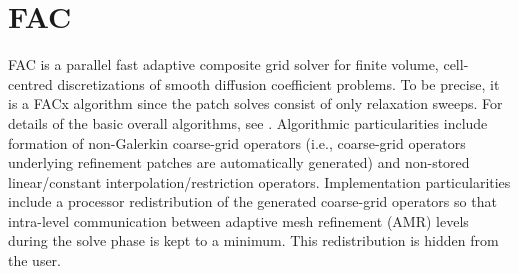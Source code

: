 
\section{FAC}

FAC is a parallel fast adaptive composite grid solver for finite volume,
cell-centred discretizations of smooth diffusion coefficient problems. 
To be precise, it is a FACx algorithm since the patch solves consist of only
relaxation sweeps. For details of the basic overall algorithms, see \cite{SFMcCormick_1989a}.
Algorithmic particularities include formation of non-Galerkin coarse-grid operators
(i.e., coarse-grid operators underlying refinement patches are automatically generated)
and non-stored linear/constant interpolation/restriction operators. Implementation particularities
include a processor redistribution of the generated coarse-grid operators so that intra-level 
communication between adaptive mesh refinement (AMR) levels during the solve phase
is kept to a minimum. This redistribution is hidden from the user.

